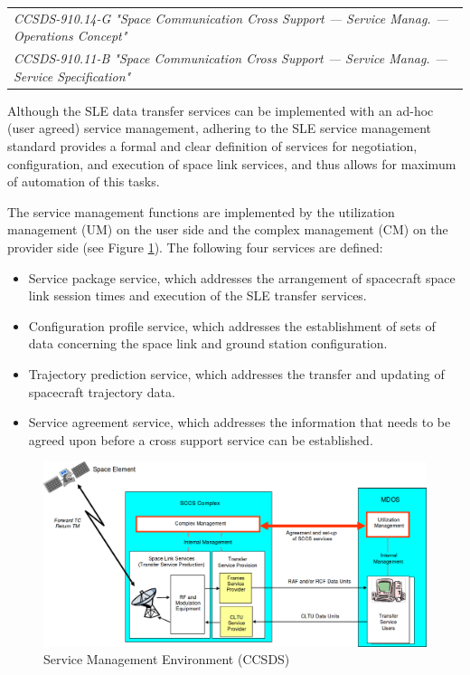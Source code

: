 \begin{tabular}{l}
\textit{CCSDS-910.14-G "Space Communication Cross Support — Service Manag. — Operations Concept" \cite{CCSDS-910.14-G}} \\
\textit{CCSDS-910.11-B "Space Communication Cross Support — Service Manag. — Service Specification" \cite{CCSDS-910.11-B}} \\
\end{tabular}

Although the SLE data transfer services can be implemented with an ad-hoc (user agreed) service management, adhering to the SLE service management standard provides a formal and clear definition of services for negotiation, configuration, and execution of space link services, and thus allows for maximum of automation of this tasks. 

The service management functions are implemented by the utilization management (UM) on the user side and the complex management (CM) on the provider side (see Figure \ref{fig:Service Management Environment}). The following four services are defined:

\begin{itemize}
\item Service package service, which addresses the arrangement of spacecraft space link session times and execution of the SLE transfer services.
\item Configuration profile service, which addresses the establishment of sets of data concerning the space link and ground station configuration.
\item Trajectory prediction service, which addresses the transfer and updating of spacecraft trajectory data.
\item Service agreement service, which addresses the information that needs to be agreed upon before a cross support service can be established.
\end{itemize}

\begin{figure}[h]
\centering\includegraphics[scale=0.3]{fig/service_management_environment}
\caption{Service Management Environment (CCSDS)}
\label{fig:Service Management Environment}
\end{figure}

